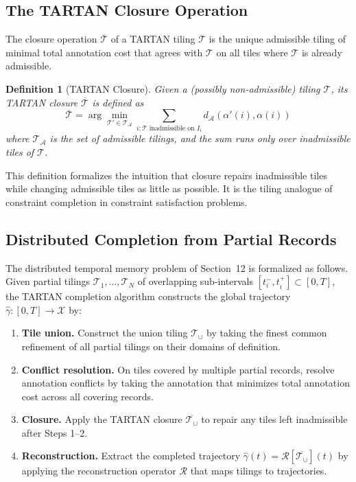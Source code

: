 \documentclass[11pt, oneside]{article}
\numberwithin{equation}{section}
\theoremstyle{rsvpstyle}
\newtheorem{definition}[theorem]{Definition}
\theoremstyle{remark}
\newcommand{\Adm}{\mathcal{A}}
\begin{document}
\subsection{The TARTAN Closure Operation}

The closure operation $\overline{\mathcal{T}}$ of a TARTAN tiling $\mathcal{T}$ is
the unique admissible tiling of minimal total annotation cost that agrees with
$\mathcal{T}$ on all tiles where $\mathcal{T}$ is already admissible.

\begin{definition}[TARTAN Closure]
Given a (possibly non-admissible) tiling $\mathcal{T}$, its TARTAN closure
$\overline{\mathcal{T}}$ is defined as
\begin{equation}
  \overline{\mathcal{T}} = \arg\min_{\mathcal{T}' \in \mathcal{T}_\Adm}
  \sum_{i : \mathcal{T} \text{ inadmissible on } I_i} d_\mathcal{A}(\alpha'(i), \alpha(i))
\end{equation}
where $\mathcal{T}_\Adm$ is the set of admissible tilings, and the sum runs only
over inadmissible tiles of $\mathcal{T}$.
\end{definition}

This definition formalizes the intuition that closure repairs inadmissible tiles
while changing admissible tiles as little as possible. It is the tiling analogue
of constraint completion in constraint satisfaction problems.

\subsection{Distributed Completion from Partial Records}

The distributed temporal memory problem of Section~12 is formalized as follows.
Given partial tilings $\mathcal{T}_1, \ldots, \mathcal{T}_N$ of overlapping
sub-intervals $[t_i^-, t_i^+] \subset [0,T]$, the TARTAN completion algorithm
constructs the global trajectory $\hat\gamma : [0,T] \to \mathcal{X}$ by:
\begin{enumerate}[label=\textbf{Step \arabic*:}]
  \item \textbf{Tile union.} Construct the union tiling $\mathcal{T}_\cup$ by
    taking the finest common refinement of all partial tilings on their domains
    of definition.
  \item \textbf{Conflict resolution.} On tiles covered by multiple partial records,
    resolve annotation conflicts by taking the annotation that minimizes total
    annotation cost across all covering records.
  \item \textbf{Closure.} Apply the TARTAN closure $\overline{\mathcal{T}_\cup}$
    to repair any tiles left inadmissible after Steps 1--2.
  \item \textbf{Reconstruction.} Extract the completed trajectory
    $\hat\gamma(t) = \mathcal{R}[\overline{\mathcal{T}_\cup}](t)$ by applying
    the reconstruction operator $\mathcal{R}$ that maps tilings to trajectories.
\end{enumerate}
\end{document}

